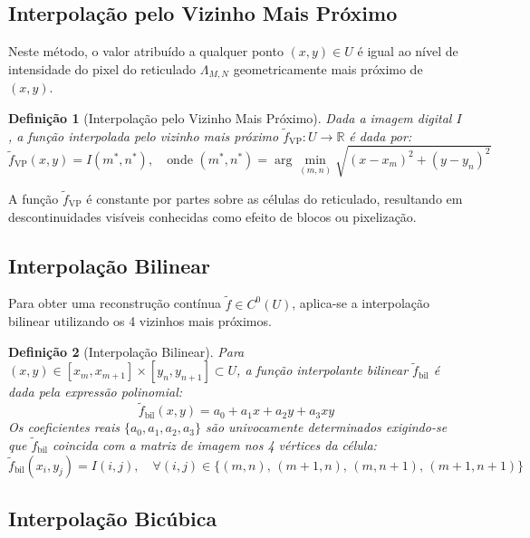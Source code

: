 \documentclass[a4paper,12pt]{report}
\newtheorem{Defini}{\bf Definição}
\begin{document}
\subsection{Interpolação pelo Vizinho Mais Próximo}

Neste método, o valor atribuído a qualquer ponto $(x,y) \in U$ é igual ao nível de intensidade do pixel do reticulado $\Lambda_{M,N}$ geometricamente mais próximo de $(x,y)$.

\begin{Defini}[Interpolação pelo Vizinho Mais Próximo]
Dada a imagem digital $I$, a função interpolada pelo vizinho mais próximo $\tilde{f}_{\text{VP}}: U \to \mathbb{R}$ é dada por:
\begin{equation}
\tilde{f}_{\text{VP}}(x,y) = I(m^*, n^*), \quad \text{onde } (m^*, n^*) = \arg\min_{(m,n)} \sqrt{(x - x_m)^2 + (y - y_n)^2}
\end{equation}
\end{Defini}
A função $\tilde{f}_{\text{VP}}$ é constante por partes sobre as células do reticulado, resultando em descontinuidades visíveis conhecidas como efeito de blocos ou pixelização.

\subsection{Interpolação Bilinear}

Para obter uma reconstrução contínua $\tilde{f} \in C^0(U)$, aplica-se a interpolação bilinear utilizando os 4 vizinhos mais próximos.

\begin{Defini}[Interpolação Bilinear]
Para $(x,y) \in [x_m, x_{m+1}] \times [y_n, y_{n+1}] \subset U$, a função interpolante bilinear $\tilde{f}_{\text{bil}}$ é dada pela expressão polinomial:
\begin{equation}
\tilde{f}_{\text{bil}}(x,y) = a_0 + a_1 x + a_2 y + a_3 x y
\end{equation}
Os coeficientes reais $\{a_0, a_1, a_2, a_3\}$ são univocamente determinados exigindo-se que $\tilde{f}_{\text{bil}}$ coincida com a matriz de imagem nos 4 vértices da célula:
\begin{equation}
\tilde{f}_{\text{bil}}(x_i, y_j) = I(i,j), \quad \forall (i,j) \in \{(m,n), \, (m+1,n), \, (m,n+1), \, (m+1,n+1)\}
\end{equation}
\end{Defini}

\subsection{Interpolação Bicúbica}
\end{document}
